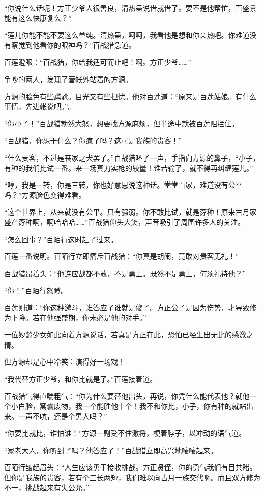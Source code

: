 \begin{this_body}
“你说什么话呢！方正少爷人很善良，清热蛊说借就借了。要不是他帮忙，百盛景能有这么快康复么？”

“莲儿你能不能不要这么单纯。清热蛊，呵呵，我看他是想和你亲热吧。你难道没有察觉到他看你的眼神吗？”百战猎急道。

百莲瞪眼：“百战猎，你给我适可而止吧！啊。方正少爷……”

争吵的两人，发现了营帐外站着的方源。

方源的脸色有些尴尬。目光又有些担忧。他对百莲道：“原来是百莲姑娘。有什么事情，先进帐说吧。”。

“你小子！”百战猎勃然大怒，想要找方源麻烦，但半途中就被百莲阻拦住。

“百战猎，你想干什么？你疯了吗？这可是我族的贵客！”

“什么贵客，不过是丧家之犬罢了。”百战猎呸了一声，手指向方源的鼻子，“小子，有种的我们比试一番。来一场真刀实枪的较量！谁若输了，就不得再纠缠莲儿。”

“哼，我是一转，你是三转，你也好意思说这种话。堂堂百家，难道没有公平吗？”方源脸色变得难看。

“这个世界上，从来就没有公平。只有强弱。你不敢比试，就是孬种！原来古月家盛产孬种啊，啊哈哈哈……”百战猎仰头大笑，声音吸引了周围许多人的关注。

“怎么回事？”百陌行这时赶了过来。

百莲一番说明。百陌行立即痛斥百战猎：“你真是胡闹，竟敢对贵客无礼！”

百战猎昂着头：“他连应战都不敢，不是勇士。既然不是勇士，何须礼待他？”

“你！”百陌行怒瞪。

百莲则道：“你这种邀斗，谁答应了谁就是傻子。方正公子是因为伤势，才导致修为下降。若在他强盛期，你未必是他的对手。”

一位妙龄少女如此向着方源说话，若真是方正在此，恐怕已经生出无比的感激之情。

但方源却是心中冷笑：演得好一场戏！

“我代替方正少爷，和你比就是了。”百莲接着道。

百战猎气得直喘粗气：“你为什么要替他出头，再说，你凭什么能代表他？就他一个小白脸，窝囊废物，我一个能胜他十个！我不和你比，小子，你有种的就站出来。一声不吭，还是个男人吗？”

“你要比就比，谁怕谁！”方源一副受不住激将，梗着脖子，以冲动的语气道。

“家老大人，你听到了吗？他答应了！”百战猎立即高兴地嚷嚷起来。

百陌行皱起眉头：“人生应该勇于接收挑战。方正贤侄，你的勇气我们有目共睹。但你是我族的贵客，若有个三长两短，我们难以向古月一族交代啊。而且双方修为不一，挑战起来有失公允。”


\end{this_body}

